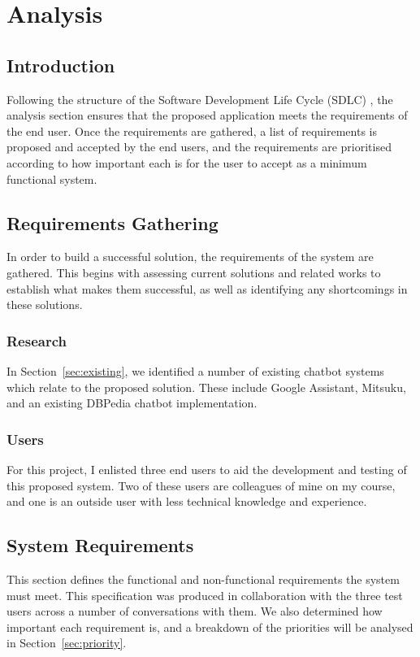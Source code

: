 \chapter{Analysis}
\section{Introduction}
Following the structure of the Software Development Life Cycle (SDLC) , the analysis section ensures that the proposed application meets the requirements of the end user. Once the requirements are gathered, a list of requirements is proposed and accepted by the end users, and the requirements are prioritised according to how important each is for the user to accept as a minimum functional system. 

\section{Requirements Gathering}
In order to build a successful solution, the requirements of the system are gathered. This begins with assessing current solutions and related works to establish what makes them successful, as well as identifying any shortcomings in these solutions.

\subsection{Research}
In Section~\ref{sec:existing}, we identified a number of existing chatbot systems which relate to the proposed solution. These include Google Assistant, Mitsuku, and an existing DBPedia chatbot implementation.

\subsection{Users}
For this project, I enlisted three end users to aid the development and testing of this proposed system. Two of these users are colleagues of mine on my course, and one is an outside user with less technical knowledge and experience.

\pagebreak
\section{System Requirements}
This section defines the functional and non-functional requirements the system must meet. This specification was produced in collaboration with the three test users across a number of conversations with them. We also determined how important each requirement is, and a breakdown of the priorities will be analysed in Section~\ref{sec:priority}.

